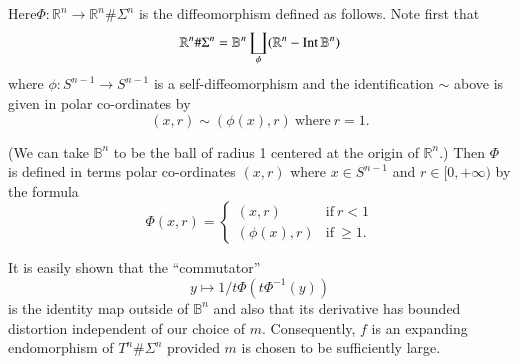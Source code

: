 Here\pageoriginale $\Phi: \mathbb{R}^n \to \mathbb{R}^n \# \Sigma^n$
is the diffeomorphism defined as follows. Note first that 
$$
\mathbb{R}^n \# \Sigma^n = \mathbb{B}^n \coprod_\phi (\mathbb{R}^n -
\operatorname{Int} \mathbb{B}^n)
$$
where $\phi: S^{n-1} \to S^{n-1}$ is a self-diffeomorphism and the
identification $\sim$ above is given in polar co-ordinates by 
$$
(x, r)\sim (\phi (x), r) ~\text{where}~ r=1.
$$

(We can take $\mathbb{B}^n$ to be the ball of radius 1 centered at the
origin of $\mathbb{R}^n$.) Then $\Phi$ is defined in terms polar
co-ordinates $(x, r)$ where $x \in S^{n-1}$ and $r \in [0, + \infty)$
  by the formula
$$
\Phi(x, r) = 
\begin{cases}
  (x, r) & \text{if}~ r < 1\\
  (\phi (x), r) & \text{if}~ \geq 1.
\end{cases}
$$

It is easily shown that the ``commutator''
$$
y \mapsto 1/t \Phi(t \Phi^{-1} (y))
$$
is the identity map outside of $\mathbb{B}^n$ and also that its
derivative has bounded distortion independent of our choice of
$m$. Consequently, $f$ is an expanding endomorphism of $T^n \#
\Sigma^n$ provided $m$ is chosen to be sufficiently large. 
